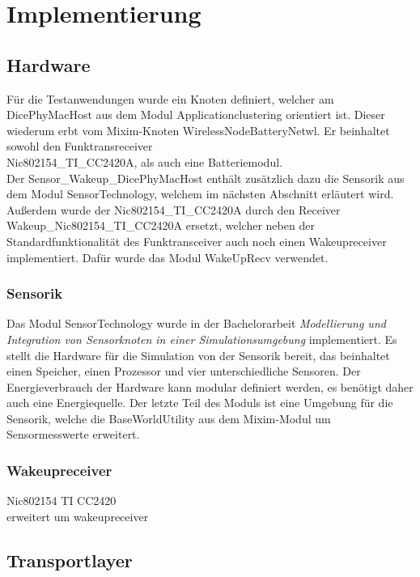 \chapter{Implementierung}

\section{Hardware}

Für die Testanwendungen wurde ein Knoten definiert, welcher am DicePhyMacHost aus dem Modul Applicationclustering orientiert ist. Dieser wiederum erbt vom Mixim-Knoten WirelessNodeBatteryNetwl. Er beinhaltet sowohl den Funktransreceiver\\
 Nic802154\_TI\_CC2420A, als auch eine Batteriemodul. \\
 Der Sensor\_Wakeup\_DicePhyMacHost enthält zusätzlich dazu die Sensorik aus dem Modul SensorTechnology, welchem im nächsten Abschnitt erläutert wird. Außerdem wurde der Nic802154\_TI\_CC2420A durch den Receiver \\
 Wakeup\_Nic802154\_TI\_CC2420A ersetzt, welcher neben der Standardfunktionalität des Funktransceiver auch noch einen Wakeupreceiver implementiert. Dafür wurde das Modul WakeUpRecv verwendet.

\subsection{Sensorik}

Das Modul SensorTechnology wurde in der Bachelorarbeit \textit{Modellierung und Integration von Sensorknoten in einer Simulationsumgebung} implementiert. Es stellt die Hardware für die Simulation von der Sensorik bereit, das beinhaltet einen Speicher, einen Prozessor und vier unterschiedliche Sensoren. Der Energieverbrauch der Hardware kann modular definiert werden, es benötigt daher auch eine Energiequelle. Der letzte Teil des Moduls ist eine Umgebung für die Sensorik, welche die BaseWorldUtility aus dem Mixim-Modul um Sensormesswerte erweitert.

\subsection{Wakeupreceiver}

Nic802154 TI CC2420\\
erweitert um wakeupreceiver


\section{Transportlayer}
